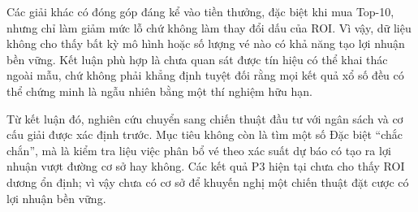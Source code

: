 Các giải khác có đóng góp đáng kể vào tiền thưởng, đặc biệt khi mua Top-10, nhưng chỉ làm giảm mức lỗ chứ không làm thay đổi dấu của ROI. Vì vậy, dữ liệu không cho thấy bất kỳ mô hình hoặc số lượng vé nào có khả năng tạo lợi nhuận bền vững. Kết luận phù hợp là chưa quan sát được tín hiệu có thể khai thác ngoài mẫu, chứ không phải khẳng định tuyệt đối rằng mọi kết quả xổ số đều có thể chứng minh là ngẫu nhiên bằng một thí nghiệm hữu hạn.

Từ kết luận đó, nghiên cứu chuyển sang chiến thuật đầu tư với ngân sách và cơ cấu giải được xác định trước. Mục tiêu không còn là tìm một số Đặc biệt ``chắc chắn'', mà là kiểm tra liệu việc phân bổ vé theo xác suất dự báo có tạo ra lợi nhuận vượt đường cơ sở hay không. Các kết quả P3 hiện tại chưa cho thấy ROI dương ổn định; vì vậy chưa có cơ sở để khuyến nghị một chiến thuật đặt cược có lợi nhuận bền vững.